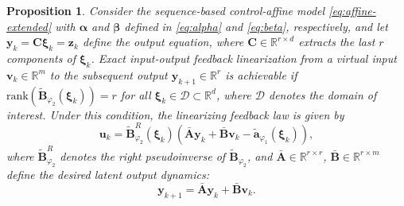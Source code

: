 \documentclass{article}
\newtheorem{proposition}{Proposition}
\begin{document}
\begin{proposition}
    \label{prop:cond-FL-extended}
    Consider the sequence-based control-affine model \eqref{eq:affine-extended} with $\boldsymbol{\alpha}$ and $\boldsymbol{\beta}$ defined in \eqref{eq:alpha} and \eqref{eq:beta}, respectively, and let $\mathbf{y}_k=\mathbf{C}\boldsymbol{\xi}_k=\mathbf{z}_k$ define the output equation, where $\mathbf{C}\in \mathbb{R}^{r \times d}$ extracts the last $r$ components of $\boldsymbol{\xi}_k$.
    Exact input-output feedback linearization from a virtual input $\mathbf{v}_k \in \mathbb{R}^m$ to the subsequent output $\mathbf{y}_{k+1} \in \mathbb{R}^r$ is achievable if $\text{rank}(\widetilde{\mathbf{B}}_{\varphi_2}(\boldsymbol{\xi}_k))=r$ for all $\boldsymbol{\xi}_k \in \mathcal{D} \subset \mathbb{R}^d$, where $\mathcal{D}$ denotes the domain of interest.
    Under this condition, the linearizing feedback law is given by
    \begin{equation}
        \label{eq:linearizing-law-extended}
        \mathbf{u}_k = \widetilde{\mathbf{B}}^{R}_{\varphi_2}(\boldsymbol{\xi}_k) \left( \bar{\mathbf{A}}\mathbf{y}_{k} + \bar{\mathbf{B}}\mathbf{v}_k - \tilde{\mathbf{a}}_{\varphi_1}(\boldsymbol{\xi}_k) \right),
    \end{equation}
    where $\widetilde{\mathbf{B}}^{R}_{\varphi_2}$ denotes the right pseudoinverse of $\widetilde{\mathbf{B}}_{\varphi_2}$, and $\bar{\mathbf{A}}\in \mathbb{R}^{r \times r}$, $\bar{\mathbf{B}} \in \mathbb{R}^{r \times m}$ define the desired latent output dynamics:
    \[
    \mathbf{y}_{k+1} = \bar{\mathbf{A}}\mathbf{y}_k + \bar{\mathbf{B}}\mathbf{v}_k.
    \]
\end{proposition}
\end{document}
